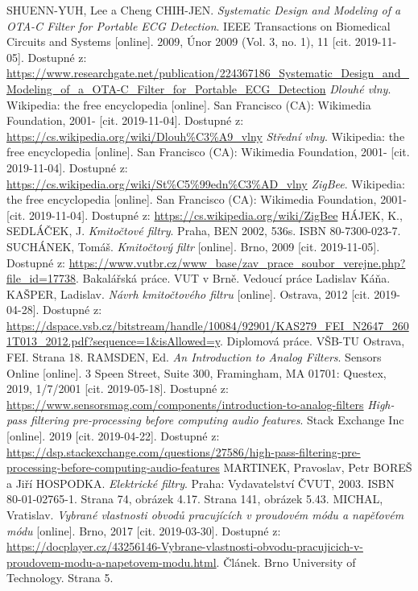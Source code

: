 \newpage
\begin{thebibliography}{999}
SHUENN-YUH, Lee a Cheng CHIH-JEN. \textit{Systematic Design and Modeling of a OTA-C Filter for Portable ECG Detection}. IEEE Transactions on Biomedical Circuits and Systems [online]. 2009, Únor 2009 (Vol. 3, no. 1), 11 [cit. 2019-11-05]. Dostupné z: \url{https://www.researchgate.net/publication/224367186_Systematic_Design_and_Modeling_of_a_OTA-C_Filter_for_Portable_ECG_Detection}
\textit{Dlouhé vlny}. Wikipedia: the free encyclopedia [online]. San Francisco (CA): Wikimedia Foundation, 2001- [cit. 2019-11-04]. Dostupné z: \url{https://cs.wikipedia.org/wiki/Dlouh%C3%A9_vlny}
\textit{Střední vlny}. Wikipedia: the free encyclopedia [online]. San Francisco (CA): Wikimedia Foundation, 2001- [cit. 2019-11-04]. Dostupné z: \url{https://cs.wikipedia.org/wiki/St%C5%99edn%C3%AD_vlny}
\textit{ZigBee}. Wikipedia: the free encyclopedia [online]. San Francisco (CA): Wikimedia Foundation, 2001- [cit. 2019-11-04]. Dostupné z: \url{https://cs.wikipedia.org/wiki/ZigBee}
HÁJEK, K., SEDLÁČEK, J. \textit{Kmitočtové  filtry}. Praha, BEN 2002, 536s. ISBN 80-7300-023-7.
SUCHÁNEK, Tomáš. \textit{Kmitočtový filtr} [online]. Brno, 2009 [cit. 2019-11-05]. Dostupné z: \url{https://www.vutbr.cz/www_base/zav_prace_soubor_verejne.php?file_id=17738}. Bakalářská práce. VUT v Brně. Vedoucí práce Ladislav Káňa.
KAŠPER, Ladislav. \textit{Návrh kmitočtového filtru} [online]. Ostrava, 2012 [cit. 2019-04-28]. Dostupné z: \url{https://dspace.vsb.cz/bitstream/handle/10084/92901/KAS279_FEI_N2647_2601T013_2012.pdf?sequence=1&isAllowed=y}. Diplomová práce. VŠB-TU Ostrava, FEI. Strana 18.
RAMSDEN, Ed. \textit{An Introduction to Analog Filters}. Sensors Online [online]. 3 Speen Street, Suite 300, Framingham, MA 01701: Questex, 2019, 1/7/2001 [cit. 2019-05-18]. Dostupné z: \url{https://www.sensorsmag.com/components/introduction-to-analog-filters}
\textit{High-pass filtering pre-processing before computing audio features}. Stack Exchange Inc [online]. 2019 [cit. 2019-04-22]. Dostupné z: \url{https://dsp.stackexchange.com/questions/27586/high-pass-filtering-pre-processing-before-computing-audio-features}
MARTINEK, Pravoslav, Petr BOREŠ a Jiří HOSPODKA. \textit{Elektrické filtry}. Praha: Vydavatelství ČVUT, 2003. ISBN 80-01-02765-1. Strana 74, obrázek 4.17. Strana 141, obrázek 5.43.
MICHAL, Vratislav. \textit{Vybrané vlastnosti obvodů pracujících v proudovém módu a napěťovém módu} [online]. Brno, 2017 [cit. 2019-03-30]. Dostupné z: \url{https://docplayer.cz/43256146-Vybrane-vlastnosti-obvodu-pracujicich-v-proudovem-modu-a-napetovem-modu.html}. Článek. Brno University of Technology. Strana 5.

\end{thebibliography}
